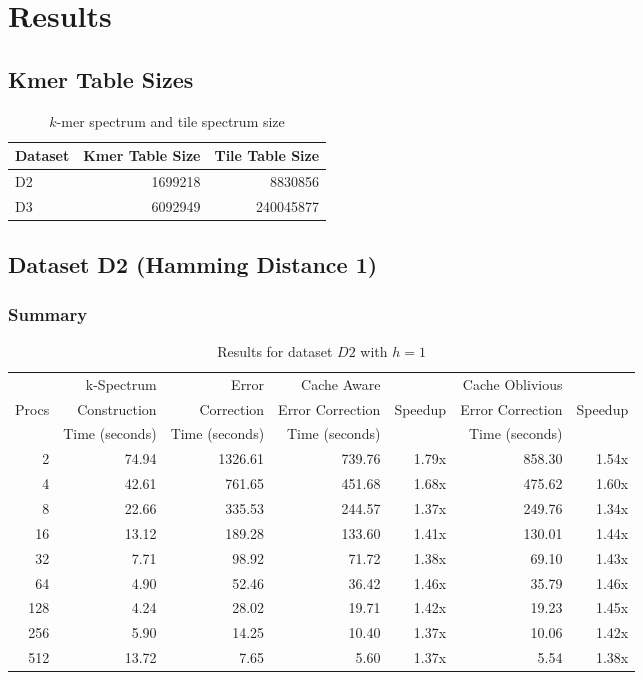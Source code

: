 \documentclass[integrals, nointegrals, article, 12pt, a4paper]{article}
\begin{document}
\section{Results}
\label{sec-3}
\subsection{Kmer Table Sizes}
\label{sec-3-1}

\begin{table}[htb]
\caption{\label{tab:spectrum}$k$-mer spectrum and tile spectrum size}
\centering
\begin{tabular}{lrr}
\hline
Dataset & Kmer Table Size & Tile Table Size\\
\hline
D2 & 1699218 & 8830856\\
D3 & 6092949 & 240045877\\
\hline
\end{tabular}
\end{table}

\subsection{Dataset D2 (Hamming Distance 1)}
\label{sec-3-2}
\subsubsection{Summary}
\label{sec-3-2-1}

\begin{table}[htb]
\caption{\label{tab:d2h1run}Results for dataset $D2$ with $h = 1$}
\centering
\begin{tabular}{rrrrrrr}
\hline
 & k-Spectrum & Error & Cache Aware &  & Cache Oblivious & \\
Procs & Construction & Correction & Error Correction & Speedup & Error Correction & Speedup\\
 & Time (seconds) & Time (seconds) & Time (seconds) &  & Time (seconds) & \\
\hline
2 & 74.94 & 1326.61 & 739.76 & 1.79x & 858.30 & 1.54x\\
4 & 42.61 & 761.65 & 451.68 & 1.68x & 475.62 & 1.60x\\
8 & 22.66 & 335.53 & 244.57 & 1.37x & 249.76 & 1.34x\\
16 & 13.12 & 189.28 & 133.60 & 1.41x & 130.01 & 1.44x\\
32 & 7.71 & 98.92 & 71.72 & 1.38x & 69.10 & 1.43x\\
64 & 4.90 & 52.46 & 36.42 & 1.46x & 35.79 & 1.46x\\
128 & 4.24 & 28.02 & 19.71 & 1.42x & 19.23 & 1.45x\\
256 & 5.90 & 14.25 & 10.40 & 1.37x & 10.06 & 1.42x\\
512 & 13.72 & 7.65 & 5.60 & 1.37x & 5.54 & 1.38x\\
\hline
\end{tabular}
\end{table}
\end{document}
